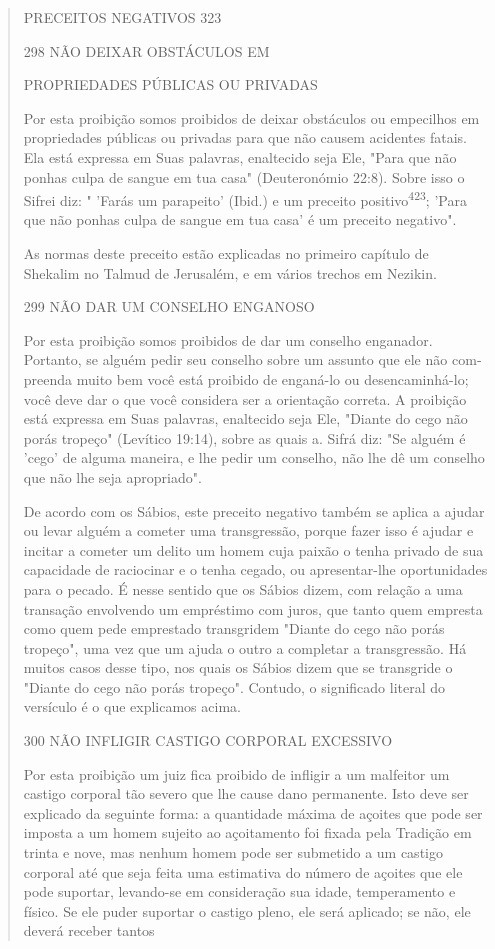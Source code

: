 \begin{quote}
PRECEITOS NEGATIVOS 323

298 NÃO DEIXAR OBSTÁCULOS EM

PROPRIEDADES PÚBLICAS OU PRIVADAS

Por esta proibição somos proibidos de deixar obstáculos ou empe­cilhos
em propriedades públicas ou privadas para que não causem acidentes
fatais. Ela está expressa em Suas palavras, enaltecido seja Ele, "Para
que não ponhas culpa de sangue em tua casa" (Deuteronómio 22:8). Sobre
isso o Sifrei diz: " 'Farás um parapeito' (Ibid.) e um preceito
positivo\textsuperscript{423}; 'Para que não po­nhas culpa de sangue em
tua casa' é um preceito negativo".

As normas deste preceito estão explicadas no primeiro capítulo de
Shekalim no Talmud de Jerusalém, e em vários trechos em Nezikin.

299 NÃO DAR UM CONSELHO ENGANOSO

Por esta proibição somos proibidos de dar um conselho enganador.
Portanto, se alguém pedir seu conselho sobre um assunto que ele não
com­preenda muito bem você está proibido de enganá-lo ou
desencaminhá-lo; você deve dar o que você considera ser a orientação
correta. A proibição está ex­pressa em Suas palavras, enaltecido seja
Ele, "Diante do cego não porás trope­ço" (Levítico 19:14), sobre as
quais a. Sifrá diz: "Se alguém é 'cego' de alguma maneira, e lhe pedir
um conselho, não lhe dê um conselho que não lhe seja apropriado".

De acordo com os Sábios, este preceito negativo também se aplica a
ajudar ou levar alguém a cometer uma transgressão, porque fazer isso é
ajudar e incitar a cometer um delito um homem cuja paixão o tenha
privado de sua capacidade de raciocinar e o tenha cegado, ou
apresentar-lhe oportunidades para o pecado. É nesse sentido que os
Sábios dizem, com relação a uma transa­ção envolvendo um empréstimo com
juros, que tanto quem empresta como quem pede emprestado transgridem
"Diante do cego não porás tropeço", uma vez que um ajuda o outro a
completar a transgressão. Há muitos casos desse tipo, nos quais os
Sábios dizem que se transgride o "Diante do cego não porás tropeço".
Contudo, o significado literal do versículo é o que explicamos acima.

300 NÃO INFLIGIR CASTIGO CORPORAL EXCESSIVO

Por esta proibição um juiz fica proibido de infligir a um malfeitor um
castigo corporal tão severo que lhe cause dano permanente. Isto deve ser
explicado da seguinte forma: a quantidade máxima de açoites que pode ser
im­posta a um homem sujeito ao açoitamento foi fixada pela Tradição em
trinta e nove, mas nenhum homem pode ser submetido a um castigo corporal
até que seja feita uma estimativa do número de açoites que ele pode
suportar, levando-se em consideração sua idade, temperamento e físico.
Se ele puder su­portar o castigo pleno, ele será aplicado; se não, ele
deverá receber tantos


\end{quote}
